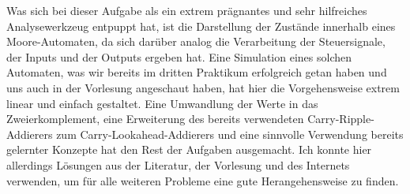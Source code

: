 \documentclass{report}
\begin{document}
Was sich bei dieser Aufgabe als ein extrem prägnantes und sehr hilfreiches Analysewerkzeug entpuppt hat, ist die Darstellung der Zustände innerhalb eines Moore-Automaten, da sich darüber analog die Verarbeitung der Steuersignale, der Inputs und der Outputs ergeben hat. Eine Simulation eines solchen Automaten, was wir bereits im dritten Praktikum erfolgreich getan haben und uns auch in der Vorlesung angeschaut haben, hat hier die Vorgehensweise extrem linear und einfach gestaltet. Eine Umwandlung der Werte in das Zweierkomplement, eine Erweiterung des bereits verwendeten Carry-Ripple-Addierers zum Carry-Lookahead-Addierers und eine sinnvolle Verwendung bereits gelernter Konzepte hat den Rest der Aufgaben ausgemacht. Ich konnte hier allerdings Lösungen aus der Literatur, der Vorlesung und des Internets verwenden, um für alle weiteren Probleme eine gute Herangehensweise zu finden.


\renewcommand{\thechapter}{C}


{}
\end{document}
